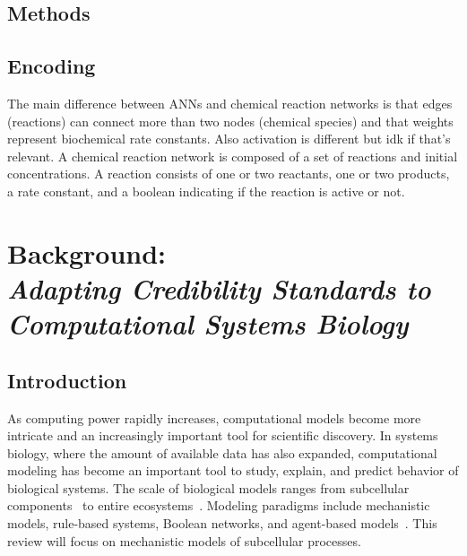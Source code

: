 \documentclass[12pt]{report}
\begin{document}
\section{Methods}
\section{Encoding}
The main difference between ANNs and chemical reaction networks is that edges (reactions) can connect more than two nodes (chemical species) and that weights represent biochemical rate constants. Also activation is different but idk if that's relevant.
A chemical reaction network is composed of a set of reactions and initial concentrations.  A reaction consists of one or two reactants, one or two products, a rate constant, and a boolean indicating if the reaction is active or not.














\chapter{Background: \\\textit{Adapting Credibility Standards to Computational Systems Biology}}


\section{Introduction}

As computing power rapidly increases, computational models become more intricate and an increasingly important tool for scientific discovery. In systems biology, where the amount of available data has also expanded, computational modeling has become an important tool to study, explain, and predict behavior of biological systems. The scale of biological models ranges from subcellular components~\cite{Wang2021} to entire ecosystems~\cite{Hassell2021}. Modeling paradigms include mechanistic models, rule-based systems, Boolean networks, and agent-based models~\cite{Bartocci2016}. This review will focus on mechanistic models of subcellular processes.
\end{document}
